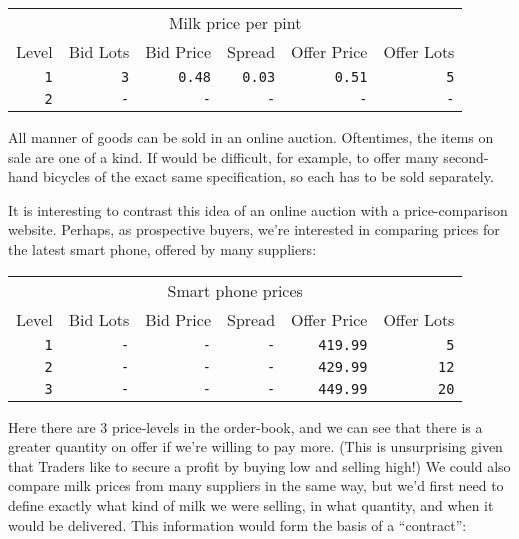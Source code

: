 \documentclass[11pt,a4paper]{article}
\begin{document}
\vspace{5mm}
\begin{tabular}{r|rrrrr}
\multicolumn{6}{c}{Milk price per pint}\\
Level&Bid Lots&Bid Price&Spread&Offer Price&Offer Lots\\
\hline
\texttt{1}&\texttt{3}&\texttt{0.48}&\texttt{0.03}&\texttt{0.51}&\texttt{5}\\
\texttt{2}&\texttt{-}&\texttt{-}&\texttt{-}&\texttt{-}&\texttt{-}\\
\end{tabular}
\vspace{5mm}

All manner of goods can be sold in an online \gls{auction}. Oftentimes, the items on sale are one of
a kind. If would be difficult, for example, to \gls{offer} many second-hand bicycles of the exact
same specification, so each has to be sold separately.

It is interesting to contrast this idea of an online \gls{auction} with a price-comparison
website. Perhaps, as prospective buyers, we're interested in comparing prices for the latest smart
phone, offered by many suppliers:

\vspace{5mm}
\begin{tabular}{r|rrrrr}
\multicolumn{6}{c}{Smart phone prices}\\
Level&Bid Lots&Bid Price&Spread&Offer Price&Offer Lots\\
\hline
\texttt{1}&\texttt{-}&\texttt{-}&\texttt{-}&\texttt{419.99}&\texttt{5}\\
\texttt{2}&\texttt{-}&\texttt{-}&\texttt{-}&\texttt{429.99}&\texttt{12}\\
\texttt{3}&\texttt{-}&\texttt{-}&\texttt{-}&\texttt{449.99}&\texttt{20}\\
\end{tabular}
\vspace{5mm}

Here there are 3 \glspl{price-level} in the \gls{order-book}, and we can see that there is a greater
quantity on \gls{offer} if we're willing to pay more. (This is unsurprising given that Traders like
to secure a profit by buying low and selling high!)  We could also compare milk prices from many
suppliers in the same way, but we'd first need to define exactly what kind of milk we were selling,
in what quantity, and when it would be delivered. This information would form the basis of a
``\gls{contract}'':
\end{document}
